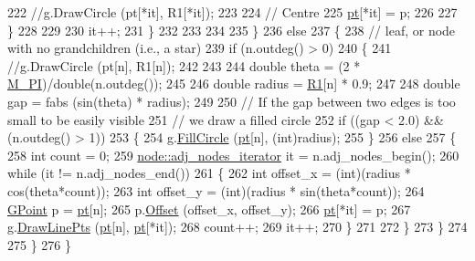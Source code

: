 \begin{DoxyCode}
222                     \textcolor{comment}{//g.DrawCircle (pt[*it], R1[*it]);}
223                     
224                     \textcolor{comment}{// Centre}
225                     \mbox{\hyperlink{rings_8cpp_af69bbacaaf68a115b351c5d1e29c3cc8}{pt}}[*it] = p;
226                     
227                 \}
228 
229                 
230                 it++;
231             \}
232 
233 
234             
235         \}
236         \textcolor{keywordflow}{else}
237         \{
238             \textcolor{comment}{// leaf, or node with no grandchildren (i.e., a star)}
239             \textcolor{keywordflow}{if} (n.outdeg() > 0)
240             \{
241                 \textcolor{comment}{//g.DrawCircle (pt[n], R1[n]);}
242                 
243                 
244                 \textcolor{keywordtype}{double} theta = (2 * \mbox{\hyperlink{rings_8cpp_ae71449b1cc6e6250b91f539153a7a0d3}{M\_PI}})/\textcolor{keywordtype}{double}(n.outdeg());
245     
246                 \textcolor{keywordtype}{double} radius = \mbox{\hyperlink{rings_8cpp_aad2cc6a2ec44dae25504cc8f1c2cff5c}{R1}}[n] * 0.9;
247     
248                 \textcolor{keywordtype}{double} gap = fabs (sin(theta) * radius);
249                 
250                 \textcolor{comment}{// If the gap between two edges is too small to be easily visible}
251                 \textcolor{comment}{// we draw a filled circle}
252                 \textcolor{keywordflow}{if} ((gap < 2.0) && (n.outdeg() > 1))
253                 \{
254                     \mbox{\hyperlink{rings_8cpp_aa9df5aa3976a89a96a5f1c7611d42938}{g}}.\mbox{\hyperlink{class_g_postscript_port_a802ee0f5b503ec12b1400e4b20725419}{FillCircle}} (\mbox{\hyperlink{rings_8cpp_af69bbacaaf68a115b351c5d1e29c3cc8}{pt}}[n], (\textcolor{keywordtype}{int})radius);
255                 \}
256                 \textcolor{keywordflow}{else}
257                 \{
258                     \textcolor{keywordtype}{int} count = 0;
259                     \mbox{\hyperlink{classnode_a392f19ea6dfa344bdf5c4d5a4b25eb8c}{node::adj\_nodes\_iterator}} it = n.adj\_nodes\_begin();
260                     \textcolor{keywordflow}{while} (it != n.adj\_nodes\_end())
261                     \{
262                         \textcolor{keywordtype}{int} offset\_x = (int)(radius * cos(theta*count));
263                         \textcolor{keywordtype}{int} offset\_y = (int)(radius * sin(theta*count));
264                         \mbox{\hyperlink{class_g_point}{GPoint}} p = \mbox{\hyperlink{rings_8cpp_af69bbacaaf68a115b351c5d1e29c3cc8}{pt}}[n];
265                         p.\mbox{\hyperlink{class_g_point_a8098fbfa3ada3a81e07313b2b4de1427}{Offset}} (offset\_x, offset\_y);
266                         \mbox{\hyperlink{rings_8cpp_af69bbacaaf68a115b351c5d1e29c3cc8}{pt}}[*it] = p;
267                         \mbox{\hyperlink{rings_8cpp_aa9df5aa3976a89a96a5f1c7611d42938}{g}}.\mbox{\hyperlink{class_g_base_port_ad176b1ff88c4c0a29d51869b13a288d2}{DrawLinePts}} (\mbox{\hyperlink{rings_8cpp_af69bbacaaf68a115b351c5d1e29c3cc8}{pt}}[n], \mbox{\hyperlink{rings_8cpp_af69bbacaaf68a115b351c5d1e29c3cc8}{pt}}[*it]);
268                         count++;
269                         it++;
270                     \}
271                 
272                 \}
273             \}
274         
275         \}
276     \}
\end{DoxyCode}
